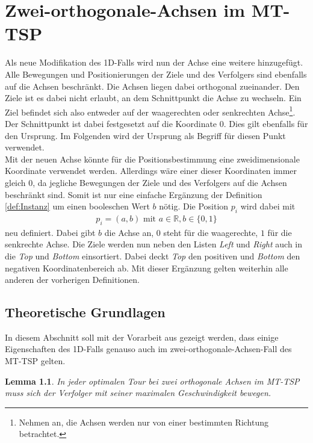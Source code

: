 \documentclass[german,version-2019-11]{uzl-thesis}
\newtheorem{lem}{Lemma}
\begin{document}
\chapter{Zwei-orthogonale-Achsen im MT-TSP}

Als neue Modifikation des 1D-Falls wird nun der Achse eine weitere hinzugefügt. Alle Bewegungen und Positionierungen der Ziele und des Verfolgers sind ebenfalls auf die Achsen beschränkt. Die Achsen liegen dabei orthogonal zueinander. Den Ziele ist es dabei nicht erlaubt, an dem Schnittpunkt die Achse zu wechseln. Ein Ziel befindet sich also entweder auf der waagerechten oder senkrechten Achse\footnote{Nehmen an, die Achsen werden nur von einer bestimmten Richtung betrachtet.}. Der Schnittpunkt ist dabei festgesetzt auf die Koordinate $0$. Dies gilt ebenfalls für den Ursprung. Im Folgenden wird der Ursprung als Begriff für diesen Punkt verwendet. \\
Mit der neuen Achse könnte für die Positionsbestimmung eine zweidimensionale Koordinate verwendet werden. Allerdings wäre einer dieser Koordinaten immer gleich $0$, da jegliche Bewegungen der Ziele und des Verfolgers auf die Achsen beschränkt sind. Somit ist nur eine einfache Ergänzung der Definition \ref{def:Instanz} um einen booleschen Wert $b$ nötig. Die Position $p_i$ wird dabei mit 
\begin{align*}
p_i = (a, b) \text{ mit } a\in\mathbb{R}, b\in \{0,1\}
\end{align*}
neu definiert. Dabei gibt $b$ die Achse an, $0$ steht für die waagerechte, $1$ für die senkrechte Achse. Die Ziele werden nun neben den Listen \emph{Left} und \emph{Right} auch in die \emph{Top} und \emph{Bottom} einsortiert. Dabei deckt \emph{Top} den positiven und \emph{Bottom} den negativen Koordinatenbereich ab. Mit dieser Ergänzung gelten weiterhin alle anderen der vorherigen Definitionen.

\section{Theoretische Grundlagen}

In diesem Abschnitt soll mit der Vorarbeit aus \cite{helvig} gezeigt werden, dass einige Eigenschaften des 1D-Falls genauso auch im zwei-orthogonale-Achsen-Fall des MT-TSP gelten.

\begin{lem}
\label{lem:1}
In jeder optimalen Tour bei zwei orthogonale Achsen im MT-TSP muss sich der Verfolger mit seiner  maximalen Geschwindigkeit bewegen.
\end{lem}
 
\end{document}
